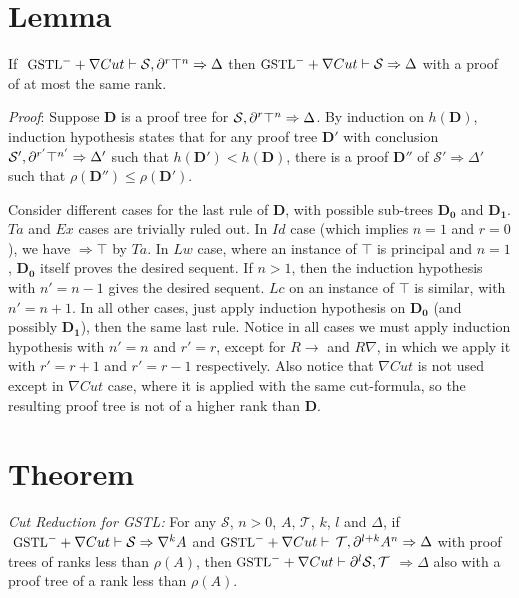 \section{Lemma}\label{true-assum} If $~\small\text{GSTL}^- + \nabla Cut \vdash \mathcal{S} , \partial^r \top^n \Rightarrow \Delta$ then $\small\text{GSTL}^- + \nabla Cut \vdash \mathcal{S} \Rightarrow \Delta$ with a proof of at most the same rank.

\textit{Proof}: Suppose $\mathbf{D}$ is a proof tree for $\mathcal{S} , \partial^r \top^n \Rightarrow \Delta$. By induction on $h(\mathbf{D})$, induction hypothesis states that for any proof tree $\mathbf{D}'$ with conclusion $\mathcal{S'} , \partial^{r'} \top^{n'} \Rightarrow \Delta'$ such that $h(\mathbf{D}') < h(\mathbf{D})$, there is a proof $\mathbf{D}''$ of $\mathcal{S}' \Rightarrow \Delta'$ such that $\rho(\mathbf{D}'') \leq \rho(\mathbf{D}')$.

Consider different cases for the last rule of $\mathbf{D}$, with possible sub-trees $\mathbf{D_0}$ and $\mathbf{D_1}$. $Ta$ and $Ex$ cases are trivially ruled out. In $Id$ case (which implies $n = 1$ and $r = 0$), we have $\Rightarrow \top$ by $Ta$. In $Lw$ case, where an instance of $\top$ is principal and $n = 1$, $\mathbf{D_0}$ itself proves the desired sequent. If $n > 1$, then the induction hypothesis with $n' = n - 1$ gives the desired sequent. $Lc$ on an instance of $\top$ is similar, with $n' = n + 1$. In all other cases, just apply induction hypothesis on $\mathbf{D_0}$ (and possibly $\mathbf{D_1}$), then the same last rule. Notice in all cases we must apply induction hypothesis with $n' = n$ and $r' = r$, except for $R\rightarrow$ and $R\nabla$, in which we apply it with $r' = r + 1$ and $r' = r - 1$ respectively. Also notice that $\nabla Cut$ is not used except in $\nabla Cut$ case, where it is applied with the same cut-formula, so the resulting proof tree is not of a higher rank than $\mathbf{D}$.

\section{Theorem}\label{cut-admis} \emph{Cut Reduction for GSTL: } For any $\mathcal{S}$, $n>0$, $A$, $\mathcal{T}$, $k$, $l$ and $\Delta$, if $~\small\text{GSTL}^- + \nabla Cut \vdash \mathcal{S} \Rightarrow \nabla^k A$ and $\small\text{GSTL}^- + \nabla Cut \vdash$ $\mathcal{T} , \partial^{l+k} A^n \Rightarrow \Delta$ with proof trees of ranks less than $\rho(A)$, then
 $\small\text{GSTL}^- + \nabla Cut \vdash \partial^l \mathcal{S} , \mathcal{T}$ $\Rightarrow \Delta$ also with a proof tree of a rank less than $\rho(A)$.
 

